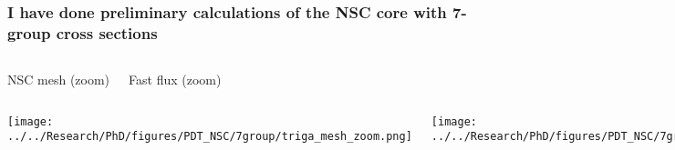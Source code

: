 \documentclass[compress,10pt]{beamer}
\begin{document}
\begin{frame}
    \frametitle{I have done preliminary calculations of the NSC core with 7-group cross sections}

    \centering
    \begin{columns}[c]


        \centering
        {\small NSC mesh (zoom)}


        \centering
        {\small Fast flux (zoom)}

    \end{columns}

    \begin{columns}[c]


        \centering
        {}\texttt{[image: ../../Research/PhD/figures/PDT\_NSC/7group/triga\_mesh\_zoom.png]} \\


        \centering
        {}\texttt{[image: ../../Research/PhD/figures/PDT\_NSC/7group/triga\_g1.png]} \\

    \end{columns}

\end{frame}

\typeout{***********************************************************************************}
\end{document}
